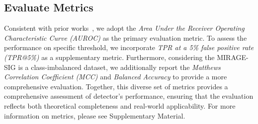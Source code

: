 \subsection{Evaluate Metrics}
Consistent with prior works~\cite{detectgpt, fastdetectgpt, imbd}, we adopt the \textit{Area Under the Receiver Operating Characteristic Curve (AUROC)} as the primary evaluation metric.
%
To assess the performance on specific threshold, we incorporate \textit{TPR at a 5\% false positive rate (TPR@5\%)} as a supplementary metric.
%
Furthermore, considering the MIRAGE-SIG is a class-imbalanced dataset, we additionally report the \textit{Matthews Correlation Coefficient (MCC)} and \textit{Balanced Accuracy} to provide a more comprehensive evaluation.
%
Together, this diverse set of metrics provides a comprehensive assessment of detector's performance, ensuring that the evaluation reflects both theoretical completeness and real-world applicability.
%
For more information on metrics, please see Supplementary Material.